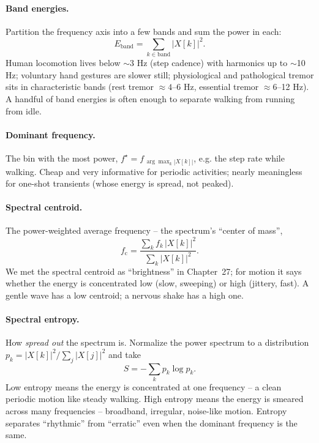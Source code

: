 \paragraph{Band energies.} Partition the frequency axis into a few bands and sum
the power in each:
\begin{equation}
\label{ch38:band}
  E_{\text{band}} = \sum_{k \in \text{band}} |X[k]|^2 .
\end{equation}
Human locomotion lives below $\sim$3 Hz (step cadence) with harmonics up to
$\sim$10 Hz; voluntary hand gestures are slower still; physiological and pathological
tremor sits in characteristic bands (rest tremor $\approx 4$--6 Hz, essential
tremor $\approx 6$--12 Hz). A handful of band energies is often enough to separate
walking from running from idle.

\paragraph{Dominant frequency.} The bin with the most power,
$f^\star = f_{\,\arg\max_k |X[k]|}$, e.g. the step rate while walking. Cheap and
very informative for periodic activities; nearly meaningless for one-shot
transients (whose energy is spread, not peaked).

\paragraph{Spectral centroid.} The power-weighted average frequency -- the
spectrum's ``center of mass'',
\begin{equation}
\label{ch38:centroid}
  f_{\text{c}} = \frac{\sum_k f_k\,|X[k]|^2}{\sum_k |X[k]|^2}.
\end{equation}
We met the spectral centroid as ``brightness'' in Chapter~27; for motion it
says whether the energy is concentrated low (slow, sweeping) or high (jittery,
fast). A gentle wave has a low centroid; a nervous shake has a high one.

\paragraph{Spectral entropy.} How \emph{spread out} the spectrum is. Normalize
the power spectrum to a distribution $p_k = |X[k]|^2 / \sum_j |X[j]|^2$ and take
\begin{equation}
\label{ch38:entropy}
  S = -\sum_k p_k \log p_k .
\end{equation}
Low entropy means the energy is concentrated at one frequency -- a clean periodic
motion like steady walking. High entropy means the energy is smeared across many
frequencies -- broadband, irregular, noise-like motion. Entropy
separates ``rhythmic'' from ``erratic'' even when the dominant frequency is the
same.

